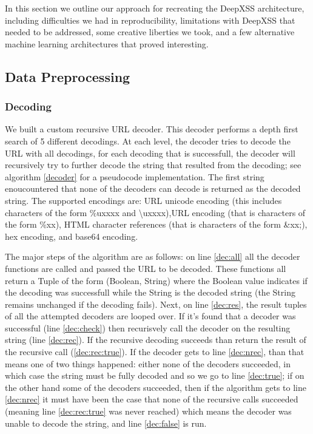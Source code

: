 In this section we outline our approach for recreating the DeepXSS architecture, including difficulties we had in reproducibility, limitations with DeepXSS that needed to be addressed, some creative liberties we took, and a few alternative machine learning architectures that proved interesting. 

\subsection{Data Preprocessing}
\subsubsection{Decoding}
We built a custom recursive URL decoder. This decoder performs a depth first search of 5 different decodings. At each level, the decoder tries to decode the URL with all decodings, for each decoding that is successfull, the decoder will recursively try to further decode the string that resulted from the decoding; see algorithm \ref{decoder} for a pseudocode implementation. The first string enoucountered that none of the decoders can decode is returned as the decoded string. The supported encodings are: URL unicode encoding (this includes characters of the form \%uxxxx and \textbackslash uxxxx),URL encoding (that is characters of the form \%xx), HTML character references (that is characters of the form \&xx;), hex encoding, and base64 encoding. 

The major steps of the algorithm are as follows: on line \ref{dec:all} all the decoder functions are called and passed the URL to be decoded. These functions all return a Tuple of the form (Boolean, String) where the Boolean value indicates if the decoding was successfull while the String is the decoded string (the String remains unchanged if the decoding fails). Next, on line \ref{dec:res}, the result tuples of all the attempted decoders are looped over. If it's found that a decoder was successful (line \ref{dec:check}) then recurisvely call the decoder on the resulting string (line \ref{dec:rec}). If the recursive decoding succeeds than return the result of the recursive call (\ref{dec:rec:true}). If the decoder gets to line \ref{dec:nrec}, than that means one of two things happened: either none of the decoders succeeded, in which case the string must be fully decoded and so we go to line \ref{dec:true}; if on the other hand some of the decoders succeeded, then if the algorithm gets to line \ref{dec:nrec} it must have been the case that none of the recursive calls succeeded (meaning line \ref{dec:rec:true} was never reached) which means the decoder was unable to decode the string, and line \ref{dec:false} is run. 

